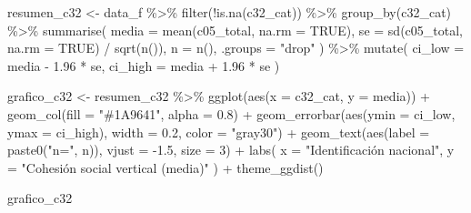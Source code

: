 \documentclass[
  spanish,
  a4paper,
  oneside]{scrbook}
\newenvironment{Shaded}{\begin{snugshade}}{\end{snugshade}}
\newcommand{\AttributeTok}[1]{\textcolor[rgb]{0.40,0.45,0.13}{#1}}
\newcommand{\ConstantTok}[1]{\textcolor[rgb]{0.56,0.35,0.01}{#1}}
\newcommand{\DecValTok}[1]{\textcolor[rgb]{0.68,0.00,0.00}{#1}}
\newcommand{\FloatTok}[1]{\textcolor[rgb]{0.68,0.00,0.00}{#1}}
\newcommand{\FunctionTok}[1]{\textcolor[rgb]{0.28,0.35,0.67}{#1}}
\newcommand{\NormalTok}[1]{\textcolor[rgb]{0.00,0.23,0.31}{#1}}
\newcommand{\OtherTok}[1]{\textcolor[rgb]{0.00,0.23,0.31}{#1}}
\newcommand{\SpecialCharTok}[1]{\textcolor[rgb]{0.37,0.37,0.37}{#1}}
\newcommand{\StringTok}[1]{\textcolor[rgb]{0.13,0.47,0.30}{#1}}
\begin{document}
\begin{Shaded}
\begin{Highlighting}[]
\NormalTok{resumen\_c32 }\OtherTok{\textless{}{-}}\NormalTok{ data\_f }\SpecialCharTok{\%\textgreater{}\%}
  \FunctionTok{filter}\NormalTok{(}\SpecialCharTok{!}\FunctionTok{is.na}\NormalTok{(c32\_cat)) }\SpecialCharTok{\%\textgreater{}\%}
  \FunctionTok{group\_by}\NormalTok{(c32\_cat) }\SpecialCharTok{\%\textgreater{}\%}
  \FunctionTok{summarise}\NormalTok{(}
    \AttributeTok{media   =} \FunctionTok{mean}\NormalTok{(c05\_total, }\AttributeTok{na.rm =} \ConstantTok{TRUE}\NormalTok{),}
    \AttributeTok{se      =} \FunctionTok{sd}\NormalTok{(c05\_total, }\AttributeTok{na.rm =} \ConstantTok{TRUE}\NormalTok{) }\SpecialCharTok{/} \FunctionTok{sqrt}\NormalTok{(}\FunctionTok{n}\NormalTok{()),}
    \AttributeTok{n       =} \FunctionTok{n}\NormalTok{(),}
    \AttributeTok{.groups =} \StringTok{"drop"}
\NormalTok{  ) }\SpecialCharTok{\%\textgreater{}\%}
  \FunctionTok{mutate}\NormalTok{(}
    \AttributeTok{ci\_low  =}\NormalTok{ media }\SpecialCharTok{{-}} \FloatTok{1.96} \SpecialCharTok{*}\NormalTok{ se,}
    \AttributeTok{ci\_high =}\NormalTok{ media }\SpecialCharTok{+} \FloatTok{1.96} \SpecialCharTok{*}\NormalTok{ se}
\NormalTok{  )}

\NormalTok{grafico\_c32 }\OtherTok{\textless{}{-}}\NormalTok{ resumen\_c32 }\SpecialCharTok{\%\textgreater{}\%}
  \FunctionTok{ggplot}\NormalTok{(}\FunctionTok{aes}\NormalTok{(}\AttributeTok{x =}\NormalTok{ c32\_cat, }\AttributeTok{y =}\NormalTok{ media)) }\SpecialCharTok{+}
  \FunctionTok{geom\_col}\NormalTok{(}\AttributeTok{fill =} \StringTok{"\#1A9641"}\NormalTok{, }\AttributeTok{alpha =} \FloatTok{0.8}\NormalTok{) }\SpecialCharTok{+}
  \FunctionTok{geom\_errorbar}\NormalTok{(}\FunctionTok{aes}\NormalTok{(}\AttributeTok{ymin =}\NormalTok{ ci\_low, }\AttributeTok{ymax =}\NormalTok{ ci\_high),}
                \AttributeTok{width =} \FloatTok{0.2}\NormalTok{, }\AttributeTok{color =} \StringTok{"gray30"}\NormalTok{) }\SpecialCharTok{+}
  \FunctionTok{geom\_text}\NormalTok{(}\FunctionTok{aes}\NormalTok{(}\AttributeTok{label =} \FunctionTok{paste0}\NormalTok{(}\StringTok{"n="}\NormalTok{, n)), }\AttributeTok{vjust =} \SpecialCharTok{{-}}\FloatTok{1.5}\NormalTok{, }\AttributeTok{size =} \DecValTok{3}\NormalTok{) }\SpecialCharTok{+}
  \FunctionTok{labs}\NormalTok{(}
    \AttributeTok{x =} \StringTok{"Identificación nacional"}\NormalTok{,}
    \AttributeTok{y =} \StringTok{"Cohesión social vertical (media)"}
\NormalTok{  ) }\SpecialCharTok{+}
  \FunctionTok{theme\_ggdist}\NormalTok{()}

\NormalTok{grafico\_c32}
\end{Highlighting}
\end{Shaded}
\end{document}
